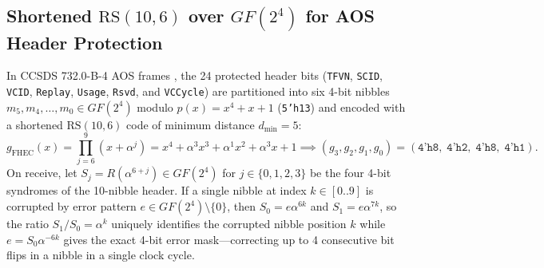 \documentclass[10pt,a4paper]{article}
\renewcommand{\_}{\origunderscore\penalty0\hskip0pt\relax}
\numberwithin{equation}{section}
\numberwithin{table}{section}
\numberwithin{figure}{section}
\begin{document}
\subsection{Shortened $\text{RS}(10,6)$ over $GF(2^4)$ for AOS Header Protection}
In CCSDS 732.0-B-4 AOS frames \cite{ccsds732}, the 24 protected header bits (\texttt{TFVN}, \texttt{SCID}, \texttt{VCID}, \texttt{Replay}, \texttt{Usage}, \texttt{Rsvd}, and \texttt{VC\_Cycle}) are partitioned into six 4-bit nibbles $m_5, m_4, \dots, m_0 \in GF(2^4)$ modulo $p(x) = x^4 + x + 1$ (\texttt{5'h13}) and encoded with a shortened $\text{RS}(10,6)$ code of minimum distance $d_{\min} = 5$:
\begin{equation}
  g_{\text{FHEC}}(x) = \prod_{j=6}^{9}(x + \alpha^j) = x^4 + \alpha^3 x^3 + \alpha^1 x^2 + \alpha^3 x + 1 \implies (g_3, g_2, g_1, g_0) = (\texttt{4'h8},\; \texttt{4'h2},\; \texttt{4'h8},\; \texttt{4'h1}).
\end{equation}
On receive, let $S_j = R(\alpha^{6+j}) \in GF(2^4)$ for $j \in \{0,1,2,3\}$ be the four 4-bit syndromes of the 10-nibble header. If a single nibble at index $k \in [0..9]$ is corrupted by error pattern $e \in GF(2^4)\setminus\{0\}$, then $S_0 = e \alpha^{6k}$ and $S_1 = e \alpha^{7k}$, so the ratio $S_1 / S_0 = \alpha^k$ uniquely identifies the corrupted nibble position $k$ while $e = S_0 \alpha^{-6k}$ gives the exact 4-bit error mask—correcting up to 4 consecutive bit flips in a nibble in a single clock cycle.
\end{document}

